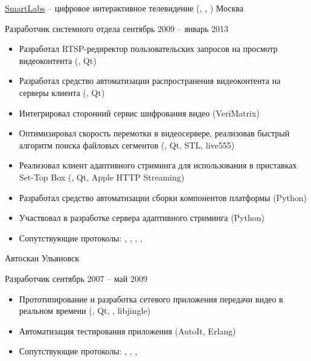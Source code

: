\documentclass[unicode, 10pt, a4paper, oneside, fleqn]{article}
\begin{document}

\job  %
    {\href{http://www.smartlabs.tv}{SmartLabs} -- цифровое
     интерактивное телевидение (, , )}
    {Москва}
    {
        \position  %
            {Разработчик системного отдела}
            {сентябрь 2009 -- январь 2013}
            {
                \begin{itemize}
                    \item{Разработал RTSP-редиректор пользовательских запросов на
                          просмотр видеоконтента (\CPP, Qt)}
                    \item{Разработал средство автоматизации распространения
                          видеоконтента на серверы клиента (\CPP, Qt)}
                    \item{Интегрировал сторонний сервис шифрования видео (VeriMatrix)}
                    \item{Оптимизировал скорость перемотки в видеосервере, реализовав
                          быстрый алгоритм поиска файловых сегментов (\CPP, Qt, STL, live555)}
                    \item{Реализовал клиент адаптивного стриминга для использования
                          в приставках Set-Top Box (\CPP, Qt, Apple HTTP Streaming)}
                    \item{Разработал средство автоматизации сборки компонентов платформы
                          (Python)}
                    \item{Участвовал в разработке сервера адаптивного стриминга (Python)}
                    \item{Сопутствующие протоколы: , , ,
                          , }
                \end{itemize}
            }
    }


\job
    {Автоскан}
    {Ульяновск}
    {
        \position
            {Разработчик}
            {сентябрь 2007 -- май 2009}
            {
                \begin{itemize}
                    \item{Прототипирование и разработка сетевого приложения
                          передачи видео в реальном времени
                          (\CPP, Qt, , libjingle)}
                    \item{Автоматизация тестирования приложения (AutoIt, Erlang)}
                    \item{Сопутствующие протоколы: , , ,
                          }
                \end{itemize}
            }
    }
\end{document}

